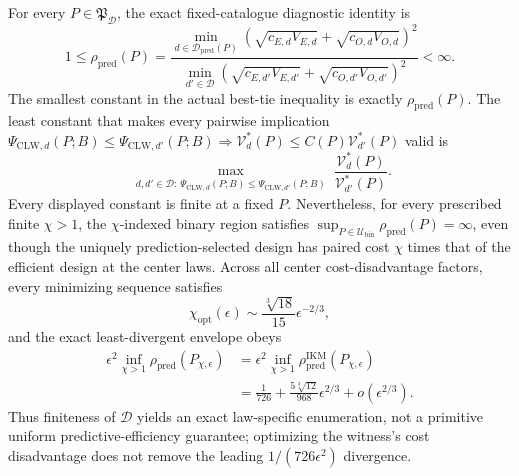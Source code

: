 For every \(P\in\mathfrak P_{\mathcal D}\), the exact fixed-catalogue diagnostic identity is
\[
 1\le\rho_{\mathrm{pred}}(P)
 =\frac{\min_{d\in\mathcal D_{\mathrm{pred}}(P)}
 (\sqrt{c_{E,d}V_{E,d}}+\sqrt{c_{O,d}V_{O,d}})^2}
 {\min_{d'\in\mathcal D}
 (\sqrt{c_{E,d'}V_{E,d'}}+\sqrt{c_{O,d'}V_{O,d'}})^2}<\infty.
\]
The smallest constant in the actual best-tie inequality is exactly \(\rho_{\mathrm{pred}}(P)\). The least constant that makes every pairwise implication
\(\Psi_{\mathrm{CLW},d}(P;B)\le\Psi_{\mathrm{CLW},d'}(P;B)\Rightarrow \mathcal V_d^*(P)\le C(P)\mathcal V_{d'}^*(P)\)
valid is
\[
 \max_{\substack{d,d'\in\mathcal D:\,
 \Psi_{\mathrm{CLW},d}(P;B)\le\Psi_{\mathrm{CLW},d'}(P;B)}}
 \frac{\mathcal V_d^*(P)}{\mathcal V_{d'}^*(P)}.
\]
Every displayed constant is finite at a fixed \(P\). Nevertheless, for every prescribed finite \(\chi>1\), the \(\chi\)-indexed binary region satisfies \(\sup_{P\in\mathcal U_{\mathrm{bin}}}\rho_{\mathrm{pred}}(P)=\infty\), even though the uniquely prediction-selected design has paired cost \(\chi\) times that of the efficient design at the center laws. Across all center cost-disadvantage factors, every minimizing sequence satisfies
\[
 \chi_{\mathrm{opt}}(\epsilon)
 \sim\frac{\sqrt[3]{18}}{15}\epsilon^{-2/3},
\]
and the exact least-divergent envelope obeys
\[
\begin{aligned}
 \epsilon^2\inf_{\chi>1}\rho_{\mathrm{pred}}(P_{\chi,\epsilon})
 &=\epsilon^2\inf_{\chi>1}\rho_{\mathrm{pred}}^{\mathrm{IKM}}(P_{\chi,\epsilon})\\
 &=\frac1{726}+\frac{5\sqrt[3]{12}}{968}\epsilon^{2/3}
 +o(\epsilon^{2/3}).
\end{aligned}
\]
Thus finiteness of \(\mathcal D\) yields an exact law-specific enumeration, not a primitive uniform predictive-efficiency guarantee; optimizing the witness's cost disadvantage does not remove the leading \(1/(726\epsilon^2)\) divergence.